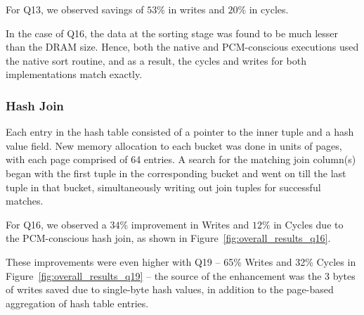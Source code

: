 \begin{comment}
The quicksort code from the GNU library was used for the conventional
version of sorting. On the other hand, the PCM-conscious version was
designed to employ a multi-pivot sort when the available DRAM was less
than the size of the data to be sorted; else, it reverted to the
native quicksort algorithm.
For Q13,  where the size of the ORDERS table is 216M, the write ratio
of native single-pivot quicksort to multi-pivot sort is estimated
by the bounds of Section~\ref{sort} to be within
$\displaystyle \frac{2}{2+ln\frac{N_R L_R}{|DRAM|} } \approx
\frac{2}{2+ln\frac {216M}{4M}  } \approx \frac{1}{3}$. These savings
are close to the $XX\%$ depicted by the ratio.
\end{comment}

\begin{comment}
the sort operator was the most heavily used and incurred
the majority of the writes and time. We observed a savings of about
70\% in writes and 20\% in running time. The size of orders table was
216M. 
\end{comment}
For Q13, we observed savings of $53\%$ in writes and $20\%$ in cycles. 

In the case of Q16, the data at the sorting stage was found to be
much lesser than the DRAM size. Hence, both the native and PCM-conscious
executions used the native sort routine, and as a result, the cycles
and writes for both implementations match exactly.

\subsubsection{Hash Join}
Each entry in the hash table consisted of a pointer to the inner tuple
and a hash value field. New memory allocation to each bucket was done in
units of pages, with each page comprised of 64 entries. A search for the
matching join column(s) began with the first tuple in the corresponding
bucket and went on till the last tuple in that bucket, simultaneously
writing out join tuples for successful matches.

For Q16, we observed a $34\%$ improvement in Writes and $12\%$ in Cycles
due to the PCM-conscious hash join, as shown in Figure~\ref{fig:overall_results_q16}. 

These improvements were even higher
with Q19  -- 65\% Writes and 32\% Cycles in Figure~\ref{fig:overall_results_q19} -- the source of the enhancement
was the 3 bytes of writes saved due to single-byte hash values,
in addition to the page-based aggregation of hash table entries.


